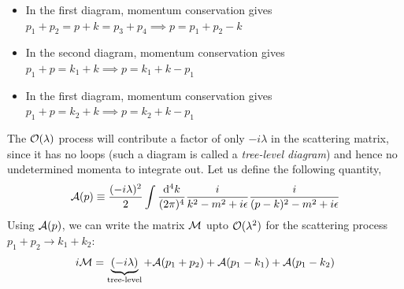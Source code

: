 \begin{center}
\end{center}
\begin{itemize}
  \item In the first diagram, momentum conservation gives $p_1+p_2 = p+k=p_3+p_4\implies p=p_1+p_2-k$
  \item In the second diagram, momentum conservation gives $p_1+p = k_1+k\implies p=k_1+k-p_1$
  \item In the first diagram, momentum conservation gives $p_1+p = k_2+k\implies p=k_2+k-p_1$
\end{itemize}
The $\mathcal O(\lambda)$ process will contribute a factor of only $-i\lambda$ in the scattering matrix, since it has no loops (such a diagram is called a \textit{tree-level diagram}) and hence no undetermined momenta to integrate out. Let us define the following quantity,
$$\mathcal A(p) \equiv \frac{(-i\lambda)^2}{2}\int \frac{\dd^4 k}{(2\pi)^4}\frac{i}{k^2-m^2+i\epsilon}\frac{i}{(p-k)^2-m^2+i\epsilon}$$
Using $\mathcal A(p)$, we can write the matrix $\mathcal M$ upto $\mathcal O(\lambda^2)$ for the scattering process $p_1+p_2\longrightarrow k_1+k_2$:
$$i\mathcal M = \underbrace{(-i\lambda)}_{\text{tree-level}}+ \mathcal A(p_1+p_2)+\mathcal A(p_1-k_1)+\mathcal A(p_1-k_2)$$
